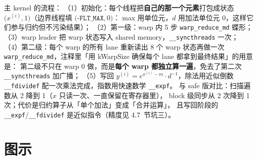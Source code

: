 

主 kernel 的流程：
（1）初始化：每个线程把\textbf{自己的那一个元素}打包成状态
$\bigl(x^{(i)}, 1\bigr)$（边界线程填 $\bigl(\texttt{-FLT\_MAX}, 0\bigr)$：
max 用单位元，$d$ 用加法单位元 0，这样它们参与归约但不污染结果）；
（2）第一级：warp 内 5 步 \texttt{warp\_\allowbreak{}reduce\_\allowbreak{}md} 蝶形；
（3）warp leader 把 warp 状态写入 shared memory，\texttt{\_\allowbreak{}\_\allowbreak{}syncthreads} 一次；
（4）第二级：每个 warp 的所有 lane 重新读出 8 个 warp 状态再做一次
\texttt{warp\_\allowbreak{}reduce\_\allowbreak{}md}，注释里「用 kWarpSize 确保每个 lane 都拿到最终结果」的用意是：
第二级不只在 warp 0 做，而是\textbf{每个 warp 都独立算一遍}，免去了第二次
\texttt{\_\allowbreak{}\_\allowbreak{}syncthreads} 加广播；
（5）写回 $y^{(i)} = e^{x^{(i)} - m} \cdot d^{-1}$，除法用近似倒数
\texttt{\_\_fdividef} 配一次乘法完成，指数用快速数学 \texttt{\_\_expf}。
与 safe 版对比：扫描遍数从 2 降到 1（$x$ 只读一次、一直保留在寄存器里），
block 级同步从 2 次降到 1 次；代价是归约算子从「单个加法」变成「合并运算」，
且写回阶段的 \texttt{\_\_expf}/\texttt{\_\_fdividef} 是近似指令（精度见 4.7~节坑三）。

\needspace{93mm}

\section{图示}

